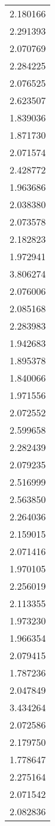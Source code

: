 \begin{longtable}[c]{l}
    2.180166 \\
    2.291393 \\
    2.070769 \\
    2.284225 \\
    2.076525 \\
    2.623507 \\
    1.839036 \\
    1.871730 \\
    2.071574 \\
    2.428772 \\
    1.963686 \\
    2.038380 \\
    2.073578 \\
    2.182823 \\
    1.972941 \\
    3.806274 \\
    2.076006 \\
    2.085168 \\
    2.283983 \\
    1.942683 \\
    1.895378 \\
    1.840066 \\
    1.971556 \\
    2.072552 \\
    2.599658 \\
    2.282439 \\
    2.079235 \\
    2.516999 \\
    2.563850 \\
    2.264036 \\
    2.159015 \\
    2.071416 \\
    1.970105 \\
    2.256019 \\
    2.113355 \\
    1.973230 \\
    1.966354 \\
    2.079415 \\
    1.787236 \\
    2.047849 \\
    3.434264 \\
    2.072586 \\
    2.179750 \\
    1.778647 \\
    2.275164 \\
    2.071542 \\
    2.082836 \\

\end{longtable}
